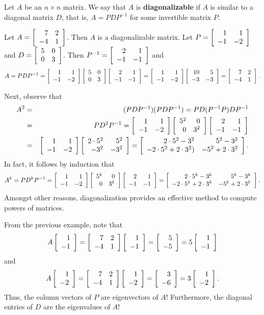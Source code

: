 \begin{Def} Let $A$ be an $n\times n$ matrix. We say that $A$ is \textbf{diagonalizable} if $A$ is similar to a diagonal matrix $D$, that is, $A = PDP^{-1}$ for some invertible matrix $P$.
\end{Def}\vs

\begin{Exam} Let $A = \mtx{rr}{7&2\\-4&1}$. Then $A$ is a diagonalizable matrix. Let $P = \mtx{rr}{1&1\\-1&-2}$ and $D= \mtx{rr}{5&0\\0&3}$. Then $P^{-1} = \mtx{rr}{2&1\\-1&-1}$ and  
\[A = PDP^{-1} = \mtx{rr}{1&1\\-1&-2}\mtx{rr}{5&0\\0&3}\mtx{rr}{2&1\\-1&-1} = \mtx{rr}{1&1\\-1&-2}\mtx{rr}{10&5\\-3&-3}  = \mtx{rr}{7&2\\-4&1}. \]

Next, observe that 
\begin{eqnarray*}
A^2 &=& (PDP^{-1})(PDP^{-1}) = PD(P^{-1}P)DP^{-1}\\
& =& PD^2P^{-1} = \mtx{rr}{1&1\\-1&-2}\mtx{rr}{5^2&0\\0&3^2}\mtx{rr}{2&1\\-1&-1}\\
&=&\mtx{rr}{1&1\\-1&-2}\mtx{rr}{2\cdot 5^2&5^2\\-3^2&-3^2} = \mtx{rr}{2\cdot 5^2-3^2 & 5^2-3^2\\ -2\cdot 5^2+2\cdot3^2) & -5^2+2\cdot 3^2}.
\end{eqnarray*} In fact, it follows by induction that 
\[A^k = PD^kP^{-1} = \mtx{rr}{1&1\\-1&-2}\mtx{rr}{5^k&0\\0&3^k}\mtx{rr}{2&1\\-1&-1} = \mtx{rr}{2\cdot 5^k-3^k & 5^k-3^k\\ -2\cdot 5^k+2\cdot3^k & -5^k+2\cdot 3^k}.\] Amongst other reasons, diagonalization provides an effective method to compute powers of matrices.
\end{Exam}\vs

From the previous example, note that \[A\vr{1\\-1} = \mtx{rr}{7&2\\-4&1}\vr{1\\-1} = \vr{5\\-5} =5\vr{1\\-1}\] and \[A\vr{1\\-2} = \mtx{rr}{7&2\\-4&1}\vr{1\\-2} = \vr{3\\-6} =3\vr{1\\-2}.\] Thus, the column vectors of $P$ are eigenvectors of $A$! Furthermore, the diagonal entries of $D$ are the eigenvalues of $A$!\\

